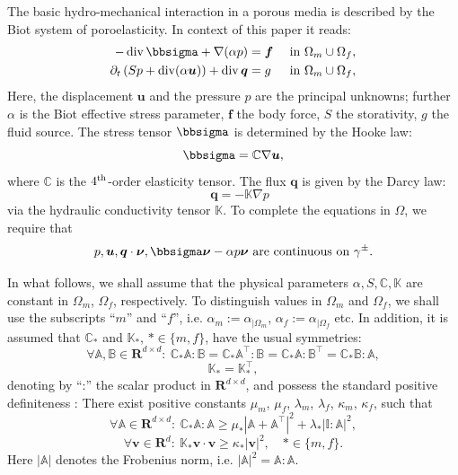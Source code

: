 \documentclass[a4paper]{article}
\def\CC{\tn C}
\def\div{\operatorname{div}}
\def\dt{\prtl_t}
\def\ff{\vc f}
\def\nnu{\vc\nu}
\def\prtl{\partial}
\def\qq{\vc q}
\def\Real{{\mathbf R}}
\def\tn#1{{\mathbb{#1}}}    %
\def\uu{\vc u}
\def\vc#1{\mathbf{\boldsymbol{#1}}}     %
\def\vv{\vc v}
\newcommand{\eq}[1]{\begin{equation}#1\end{equation}}
\newcommand{\eqs}[1]{\begin{equation*}#1\end{equation*}}
\begin{document}
The basic hydro-mechanical interaction in a porous media is described by the Biot system of poroelasticity.
In context of this paper it reads:
\begin{subequations}
\label{eq:biot}
\begin{align}
    \label{eq:lin_el}
    -\div \bbsigma + \nabla(\alpha p) &= \ff &&\mbox{ in }\Omega_m\cup\Omega_f,\\
\label{eq:biot_darcy}    \dt\left(Sp + \div(\alpha\uu)\right) + \div\qq &= g &&\mbox{ in }\Omega_m\cup\Omega_f,
\end{align}
\end{subequations}
Here, the displacement $\uu$ and the pressure $p$ are the principal unknowns; further $\alpha$ is the Biot effective stress parameter, $\ff$ the body force, $S$ the storativity, $g$ the fluid source.
The stress tensor $\bbsigma$ is determined by the Hooke law:
\eqs{ \bbsigma = \CC\nabla\uu, }
where $\CC$ is the $4^{\rm th}$-order elasticity tensor.
The flux $\qq$ is given by the Darcy law:
\eqs{ \quad \qq = -\tn K\nabla p }
via the hydraulic conductivity tensor $\tn K$.
To complete the equations in $\Omega$, we require that
\eq{ \label{eq:continuity_on_gamma_pm} p,\uu,\qq\cdot\nnu,\bbsigma\nnu-\alpha p\nnu \mbox{ are continuous on } \gamma^\pm. }

In what follows, we shall assume that the physical parameters $\alpha,S,\CC,\tn K$ are constant in $\Omega_m$, $\Omega_f$, respectively.
To distinguish values in $\Omega_m$ and $\Omega_f$, we shall use the subscripts ``$m$'' and ``$f$'', i.e. $\alpha_m := \alpha_{|\Omega_m}$, $\alpha_f := \alpha_{|\Omega_f}$ etc.
In addition, it is assumed that $\CC_*$ and $\tn K_*$, $*\in\{m,f\}$, have the usual symmetries:
\eqs{ \forall \tn A,\tn B\in\Real^{d\times d}:~ \CC_*\tn A:\tn B=\CC_*\tn A^\top:\tn B=\CC_*\tn A:\tn B^\top=\CC_*\tn B:\tn A, }
\eqs{ \tn K_* = \tn K_*^\top, }
denoting by ``:'' the scalar product in $\Real^{d\times d}$, and possess the standard positive definiteness \cite{gurtin}:
There exist positive constants $\mu_m$, $\mu_f$, $\lambda_m$, $\lambda_f$, $\kappa_m$, $\kappa_f$, such that
\eq{ \label{eq:pos_def_C_gen} \forall\tn A\in\Real^{d\times d}:~\CC_*\tn A:\tn A \ge \mu_*\left|\tn A+\tn A^\top\right|^2 + \lambda_*|\tn I:\tn A|^2, }
\eq{ \label{eq:pos_def_K} \forall\vv\in\Real^d:~\tn K_*\vv\cdot\vv \ge \kappa_*|\vv|^2,\quad *\in\{m,f\}. }
Here
$|\tn A|$ denotes the Frobenius norm, i.e. $|\tn A|^2=\tn A:\tn A$.
\end{document}
